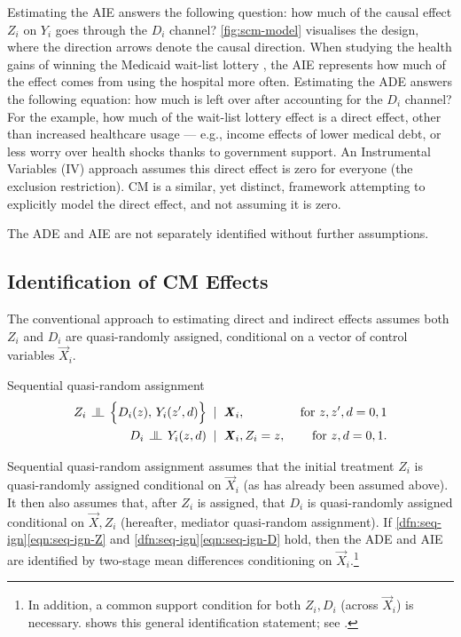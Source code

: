 Estimating the AIE answers the following question: how much of the causal effect $Z_i$ on $Y_i$ goes through the $D_i$ channel?
\autoref{fig:scm-model} visualises the design, where the direction arrows denote the causal direction.
When studying the health gains of winning the Medicaid wait-list lottery \citep{finkelstein2008oregon}, the AIE represents how much of the effect comes from using the hospital more often.
Estimating the ADE answers the following equation: how much is left over after accounting for the $D_i$ channel?
For the example, how much of the wait-list lottery effect is a direct effect, other than increased healthcare usage --- e.g., income effects of lower medical debt, or less worry over health shocks thanks to government support.
An Instrumental Variables (IV) approach assumes this direct effect is zero for everyone (the exclusion restriction).
CM is a similar, yet distinct, framework attempting to explicitly model the direct effect, and not assuming it is zero.

The ADE and AIE are not separately identified without further assumptions.

\subsection{Identification of CM Effects}
The conventional approach to estimating direct and indirect effects assumes both $Z_i$ and $D_i$ are quasi-randomly assigned, conditional on a vector of control variables $\vec X_i$.
\begin{definition}
    \label{dfn:seq-ign}
    Sequential quasi-random assignment \citep{imai2010identification}
    \begin{align}
        \label{eqn:seq-ign-Z}
        Z_i \; \indep \; \Big\{ D_i(z),\, Y_i(z', d) \Big\} \;\; &| \;\; \vec X_i,
            &\textnormal{ for } z, z', d = 0, 1 \\
        \label{eqn:seq-ign-D}
        D_i \; \indep \; Y_i(z, d) \;\; &| \;\; \vec X_i, Z_i = z, 
            &\textnormal{ for } z, d = 0, 1.
    \end{align}
\end{definition}
Sequential quasi-random assignment assumes that the initial treatment $Z_i$ is quasi-randomly assigned conditional on $\vec X_i$ (as has already been assumed above).
It then also assumes that, after $Z_i$ is assigned, that $D_i$ is quasi-randomly assigned conditional on $\vec X, Z_i$ (hereafter, mediator quasi-random assignment).
If \ref{dfn:seq-ign}\eqref{eqn:seq-ign-Z} and \ref{dfn:seq-ign}\eqref{eqn:seq-ign-D} hold, then the ADE and AIE are identified by two-stage mean differences conditioning on $\vec X_i$.\footnote{
    In addition, a common support condition for both $Z_i, D_i$ (across $\vec X_i$) is necessary.
    \cite{imai2010identification} shows this general identification statement; see .
}
\vspace{0.1cm}

